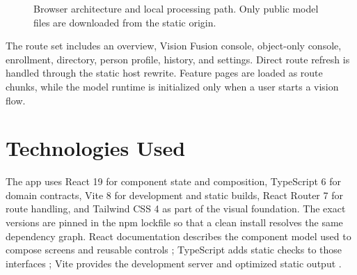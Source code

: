 \documentclass[11pt,oneside,openany]{report}
\begin{document}
\begin{figure}[htbp]
\centering
{}
\caption{Browser architecture and local processing path. Only public model files are downloaded from the static origin.}
\label{fig:architecture}
\end{figure}

The route set includes an overview, Vision Fusion console, object-only console, enrollment, directory, person profile, history, and settings. Direct route refresh is handled through the static host rewrite. Feature pages are loaded as route chunks, while the model runtime is initialized only when a user starts a vision flow.

\chapter{Technologies Used}
The app uses React 19 for component state and composition, TypeScript 6 for domain contracts, Vite 8 for development and static builds, React Router 7 for route handling, and Tailwind CSS 4 as part of the visual foundation. The exact versions are pinned in the npm lockfile so that a clean install resolves the same dependency graph. React documentation describes the component model used to compose screens and reusable controls \cite{react}; TypeScript adds static checks to those interfaces \cite{typescript}; Vite provides the development server and optimized static output \cite{vite}.
\end{document}
